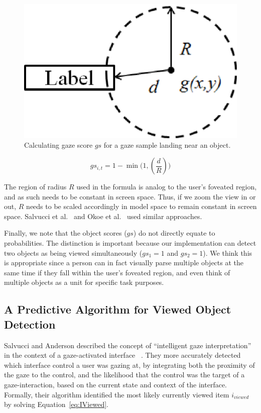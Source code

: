 \begin{figure}[htb]
  \centering
  \includegraphics[width=0.6\linewidth]{images/gazeScoreFig3.eps}
  \caption{Calculating gaze score $gs$ for a gaze sample landing near an object. }
	\label{fig:gazeScoreFig3}
\end{figure}

\begin{equation}
gs_{i,t} = 1 - \min \Big (1, (\frac{d}{R}) \Big )
\label{eq:GS}
\end{equation}

The region of radius $R$ used in the formula is analog to the user's foveated region, and as such needs to be constant in screen space. Thus, if we zoom the view in or out, $R$ needs to be scaled accordingly in model space to remain constant in screen space.  Salvucci et al.~\cite{Sal00} and Okoe et al.~\cite{Okoe14} used similar approaches.

Finally, we note that the object scores ($gs$) do not directly equate to probabilities. The distinction is important because our implementation can detect two objects as being viewed simultaneously ($gs_1 = 1$ and $gs_2=1$). We think this is appropriate since a person can in fact visually parse multiple objects at the same time if they fall within the user's foveated region, and even think of multiple objects as a unit for specific task purposes.



\subsection{A Predictive Algorithm for Viewed Object Detection}
\label{sec:MehthodsIntelligentAlgorithm}

Salvucci and Anderson described the concept of ``intelligent gaze interpretation'' in the context of a gaze-activated interface ~\cite{Sal00}. They more accurately detected which interface control a user was gazing at, by integrating both the proximity of the gaze to the control, and the likelihood that the control was the target of a gaze-interaction, based on the current state and context of the interface. Formally, their algorithm identified the most likely currently viewed item $i_{viewed}$ by solving Equation~\ref{eq:IViewed}.

